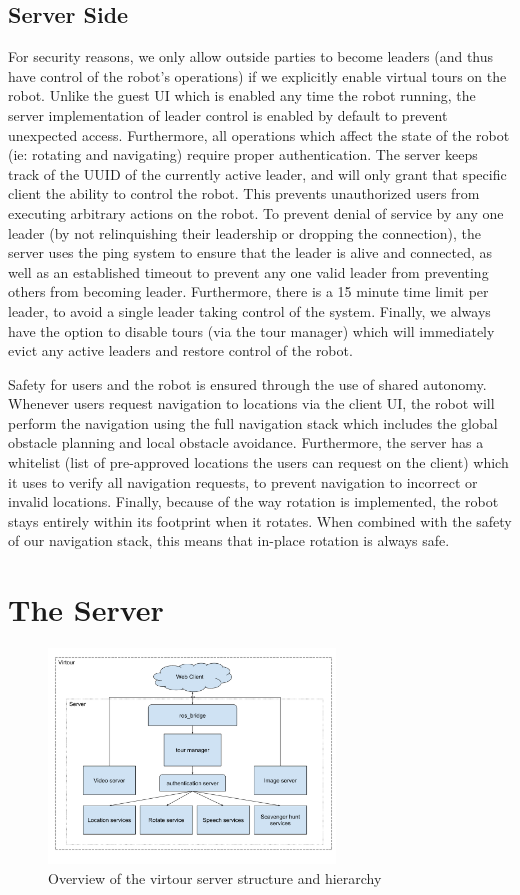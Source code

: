 \documentclass[
  oneside,
  11pt, a4paper,
  footinclude=true,
  headinclude=true,
  cleardoublepage=empty
]{article}
\begin{document}
\subsection{Server Side}

For security reasons, we only allow outside parties to become leaders (and thus
have control of the robot's operations) if we explicitly enable virtual tours
on the robot. Unlike the guest UI which is enabled any time the robot running,
the server implementation of leader control is enabled by default to prevent
unexpected access. Furthermore, all operations which affect the state of the
robot (ie: rotating and navigating) require proper authentication. The server
keeps track of the UUID of the currently active leader, and will only grant
that specific client the ability to control the robot. This prevents
unauthorized users from executing arbitrary actions on the robot. To prevent
denial of service by any one leader (by not relinquishing their leadership or
dropping the connection), the server uses the ping system to ensure that the
leader is alive and connected, as well as an established timeout to prevent any
one valid leader from preventing others from becoming leader. Furthermore,
there is a 15 minute time limit per leader, to avoid a single leader taking
control of the system. Finally, we always have the option to disable tours (via
the tour manager) which will immediately evict any active leaders and restore
control of the robot.

Safety for users and the robot is ensured through the use of shared autonomy.
Whenever users request navigation to locations via the client UI, the robot
will perform the navigation using the full navigation stack which includes the
global obstacle planning and local obstacle avoidance. Furthermore, the server
has a whitelist (list of pre-approved locations the users can request on the
client) which it uses to verify all navigation requests, to prevent navigation
to incorrect or invalid locations. Finally, because of the way rotation is
implemented, the robot stays entirely within its footprint when it rotates.
When combined with the safety of our navigation stack, this means that in-place
rotation is always safe.


\section{The Server}

\begin{figure}
\centering
\includegraphics[width=3in]{virtour_server}
\caption{Overview of the virtour server structure and hierarchy}
\end{figure}
\end{document}
